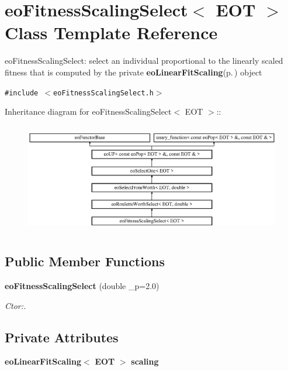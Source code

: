 \section{eo\-Fitness\-Scaling\-Select$<$ EOT $>$ Class Template Reference}
\label{classeo_fitness_scaling_select}
eo\-Fitness\-Scaling\-Select: select an individual proportional to the linearly scaled fitness that is computed by the private {\bf eo\-Linear\-Fit\-Scaling}{\rm (p.\,\pageref{classeo_linear_fit_scaling})} object  


{\tt \#include $<$eo\-Fitness\-Scaling\-Select.h$>$}

Inheritance diagram for eo\-Fitness\-Scaling\-Select$<$ EOT $>$::\begin{figure}[H]
\begin{center}
\leavevmode
\includegraphics[height=4.85549cm]{classeo_fitness_scaling_select}
\end{center}
\end{figure}
\subsection*{Public Member Functions}
\begin{CompactItemize}
\item 
{\bf eo\-Fitness\-Scaling\-Select} (double \_\-p=2.0)
\begin{CompactList}\small\item\em Ctor:. \item\end{CompactList}\end{CompactItemize}
\subsection*{Private Attributes}
\begin{CompactItemize}
\item 
{\bf eo\-Linear\-Fit\-Scaling}$<$ {\bf EOT} $>$ {\bf scaling}\label{classeo_fitness_scaling_select_r0}

\end{CompactItemize}


